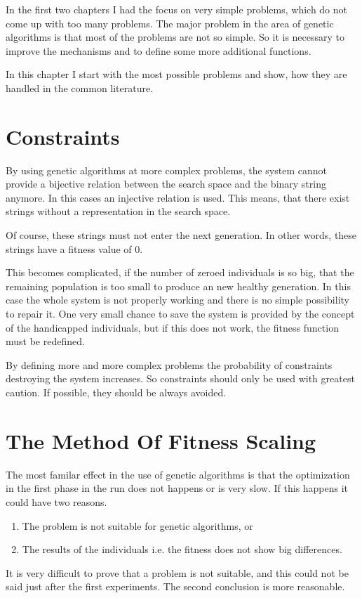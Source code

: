 In the first two chapters I had the focus on very simple problems, which do
not come up with too many problems. The major problem in the area of genetic
algorithms is that most of the problems are not so simple. So it is necessary to
improve the mechanisms and to define some more additional functions.

In this chapter I start with the most possible problems and show, how they are
handled in the common literature.
\section{Constraints}
By using genetic algorithms at more complex problems, the system cannot provide
a bijective relation between the search space and the binary string anymore.
In this cases an injective relation is used. This means, that there exist strings
without a representation in the search space.

Of course, these strings must not enter the next generation. In other words,
these strings have a fitness value of 0.

This becomes complicated, if the number of zeroed individuals is so big, that
the remaining population is too small to produce an new healthy generation. In
this case the whole system is not properly working and there is no simple possibility
to repair it. One very small chance to save the system is provided by the concept
of the handicapped individuals, but if this does not work, the fitness function
must be redefined.

By defining more and more complex problems the probability of constraints destroying
the system increases. So constraints should only be used with greatest caution.
If possible, they should be always avoided.
\section{The Method Of Fitness Scaling}
The most familar effect in the use of genetic algorithms is that the optimization
in the first phase in the run does not happens or is very slow. If this happens it
could have two reasons.
\begin{enumerate}
  \item The problem is not suitable for genetic algorithms, or
  \item The results of the individuals i.e. the fitness does not show big
differences.
\end{enumerate}
It is very difficult to prove that a problem is not suitable, and this could
not be said just after the first experiments. The second conclusion is more
reasonable.

